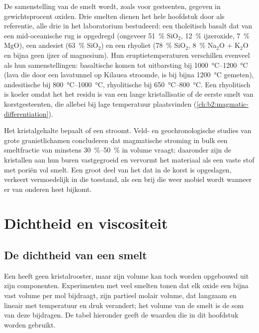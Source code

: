 De samenstelling van de smelt wordt, zoals voor gesteenten, gegeven in gewichtsprocent
oxiden. Drie smelten dienen het hele hoofdstuk door als referentie, alle drie
in het laboratorium bestudeerd: een tholeïtisch basalt dat van een mid-oceanische rug is opgedregd
(ongeveer \qty{51}{\percent} SiO$_2$, \qty{12}{\percent} ijzeroxide, \qty{7}{\percent}
MgO), een andesiet (\qty{63}{\percent} SiO$_2$) en een rhyoliet (\qty{78}{\percent}
SiO$_2$, \qty{8}{\percent} Na$_2$O $+$ K$_2$O en bijna geen ijzer of magnesium).
Hun eruptietemperaturen verschillen evenveel als hun samenstellingen: basaltische
 komen tot uitbarsting bij \qtyrange{1000}{1200}{\celsius} (lava die door een lavatunnel op
Kilauea stroomde, is bij bijna \qty{1200}{\celsius} gemeten), andesitische  bij
\qtyrange{800}{1000}{\celsius}, rhyolitische  bij \qtyrange{650}{800}{\celsius}.
Een rhyolitisch  is koeler omdat het het residu is van een lange kristallisatie
of de eerste smelt van korstgesteenten, die allebei bij lage temperatuur plaatsvinden
(\cref{ch:b2:magmatic-differentiation}).

Het kristalgehalte bepaalt of een  stroomt. Veld- en geochronologische
studies van grote granietlichamen concluderen dat magmatische stroming in bulk een
smeltfractie van minstens \qtyrange{30}{50}{\percent} in volume vraagt; daaronder zijn de
kristallen aan hun buren vastgegroeid en vervormt het materiaal als een vaste stof met
poriën vol smelt. Een groot deel van het  dat in de korst is opgeslagen, verkeert vermoedelijk in
die toestand, als een brij die weer mobiel wordt wanneer er van onderen heet 
bijkomt.

\section{Dichtheid en viscositeit}

\subsection{De dichtheid van een smelt}

Een  heeft geen kristalrooster, maar zijn volume kan toch worden opgebouwd uit
zijn componenten. Experimenten met veel smelten tonen dat elk oxide een
bijna vast volume per mol bijdraagt, zijn partieel molair volume, dat langzaam en
lineair met temperatuur en druk verandert; het volume van de smelt is de som van
deze bijdragen. De tabel hieronder geeft de waarden die in dit hoofdstuk worden gebruikt.

